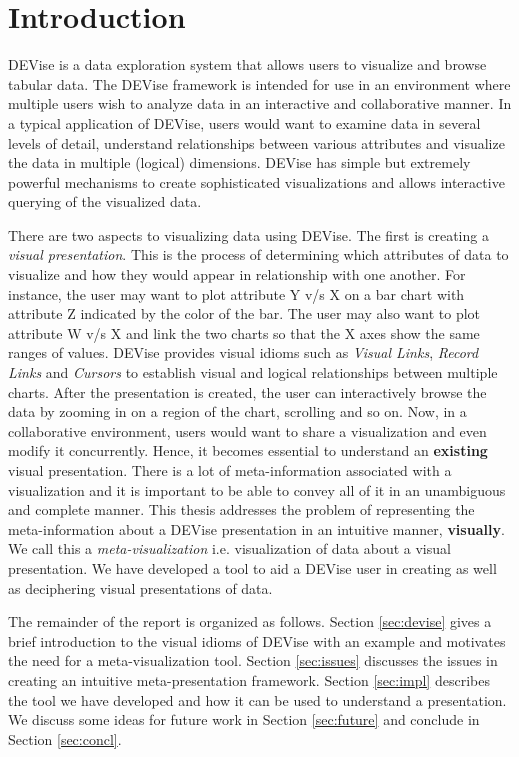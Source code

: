\section{Introduction}
\label{sec:intro}

DEVise is a data exploration system that allows users to visualize and 
browse tabular data. The DEVise framework is intended for use in an 
environment where multiple users wish to analyze data in an interactive
and collaborative manner. In a typical application of DEVise, users would
want to examine data in several levels of detail, understand relationships
between various attributes and visualize the data in multiple (logical)
dimensions. DEVise has simple but extremely powerful mechanisms to create
sophisticated visualizations and allows interactive querying of the 
visualized data.

There are two aspects to visualizing data using DEVise. The first is 
creating a {\it visual presentation}. This is the process of determining
which attributes of data to visualize and how they would appear in 
relationship with one another. For instance, the user may want to plot
attribute Y v/s X on a bar chart with attribute Z indicated by the color
of the bar. The user may also want to plot attribute W v/s X and link
the two charts so that the X axes show the same ranges of values. DEVise
provides visual idioms such as {\it Visual Links}, {\it Record Links}
and {\it Cursors} to establish visual and logical relationships between
multiple charts.
After the presentation is created, the user can interactively browse the data
by zooming in on a region of the chart, scrolling and so on. Now, in a 
collaborative environment, users would want to share a visualization
and even modify it concurrently. Hence, it becomes essential to understand
an {\bf existing} visual presentation. There is a lot of meta-information
associated
with a visualization and it is important to be able to convey all of it in an
unambiguous and complete manner. This thesis addresses the problem of 
representing the meta-information about a DEVise presentation in an 
intuitive manner, {\bf visually}. We call this a {\it meta-visualization} i.e.
visualization of data about a  visual presentation. We have developed a tool
to aid a DEVise user in creating as well as deciphering visual presentations
of data. 

The remainder of the report is organized as follows. Section \ref{sec:devise}
gives a brief introduction to the visual idioms of DEVise with an example
and motivates the need for a meta-visualization tool.  Section \ref{sec:issues}
discusses the issues in creating an intuitive meta-presentation
framework. Section \ref{sec:impl} describes the tool we have developed
and how it can be used to understand a presentation. We discuss some ideas for
future work in Section \ref{sec:future} and conclude in Section \ref{sec:concl}. 


